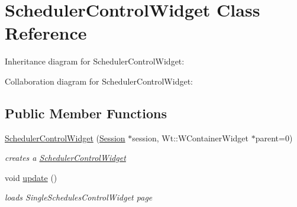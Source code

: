 \hypertarget{classSchedulerControlWidget}{}\section{Scheduler\+Control\+Widget Class Reference}
\label{classSchedulerControlWidget}


Inheritance diagram for Scheduler\+Control\+Widget\+:


Collaboration diagram for Scheduler\+Control\+Widget\+:
\subsection*{Public Member Functions}
\begin{DoxyCompactItemize}
\item 
\hyperlink{classSchedulerControlWidget_a88824ef71ef84e9e5bdb85ab3f4f9952}{Scheduler\+Control\+Widget} (\hyperlink{classSession}{Session} $\ast$session, Wt\+::\+W\+Container\+Widget $\ast$parent=0)
\begin{DoxyCompactList}\small\item\em creates a \hyperlink{classSchedulerControlWidget}{Scheduler\+Control\+Widget} \end{DoxyCompactList}\item 
void \hyperlink{classSchedulerControlWidget_acca1c74b4dc6fa16c079da6b2e946f4b}{update} ()
\begin{DoxyCompactList}\small\item\em loads Single\+Schedules\+Control\+Widget page \end{DoxyCompactList}\end{DoxyCompactItemize}
